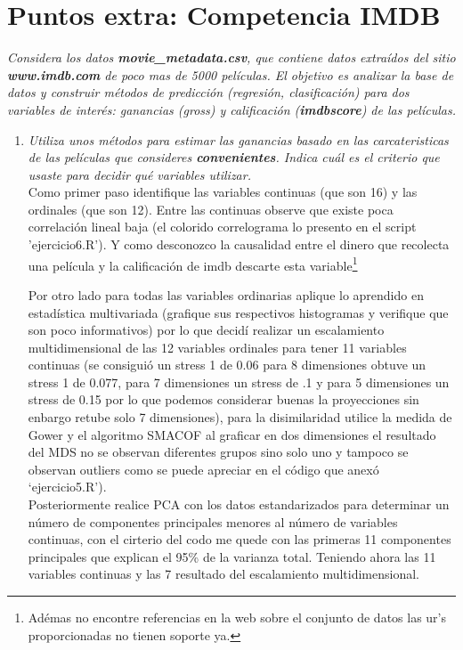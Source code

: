 \documentclass[paper=letter, fontsize=11pt]{scrartcl}
\numberwithin{equation}{section} %
\numberwithin{figure}{section} %
\numberwithin{table}{section} %
\begin{document}
\section{ Puntos extra: Competencia IMDB}
\textit{
Considera los datos \textbf{movie\_metadata.csv}, que contiene datos extraídos del sitio \textbf{www.imdb.com} de poco mas de 5000 películas. El objetivo es analizar la base de datos y construir métodos de predicción (regresión, clasificación) para dos variables de interés: ganancias (gross) y calificación (\textbf{imdbscore}) de las películas.}
\begin{enumerate}


\item \textit{Utiliza unos métodos para estimar las ganancias basado en las carcateristicas de las películas que consideres 
\textbf{convenientes}. Indica cuál es el criterio que usaste para decidir qué variables utilizar. }\\

Como primer paso identifique las variables continuas (que son 16) y las ordinales (que son 12). Entre las continuas observe que existe poca correlación lineal baja (el colorido correlograma lo presento en el script 'ejercicio6.R'). Y como desconozco la causalidad entre el dinero que recolecta una película y la calificación de imdb descarte esta variable\footnote{Adémas no encontre referencias en la web sobre el conjunto de datos las ur's proporcionadas no tienen soporte ya.}

Por otro lado para todas las variables ordinarias aplique lo aprendido en estadística multivariada (grafique sus respectivos histogramas y verifique que son poco informativos) por lo que decidí realizar un escalamiento multidimensional de las 12 variables ordinales para tener 11 variables continuas (se consiguió un stress 1 de 0.06 para 8 dimensiones obtuve un stress 1 de 0.077, para 7 dimensiones un stress de .1 y para 5 dimensiones un stress de 0.15 por lo que podemos considerar buenas la proyecciones sin enbargo retube solo 7 dimensiones), para la disimilaridad utilice la medida de Gower y el algoritmo SMACOF al graficar en dos dimensiones el resultado del MDS no se observan diferentes grupos sino solo uno y tampoco se observan outliers como se puede apreciar en el código que anexó ‘ejercicio5.R’). \\
Posteriormente realice PCA con los datos estandarizados para determinar un número de componentes principales menores al número de variables continuas, con el cirterio del codo me quede con las primeras 11 componentes principales que explican el 95\% de la varianza total. Teniendo ahora las 11 variables continuas  y las 7 resultado del escalamiento multidimensional. \\


\end{enumerate}
\end{document}
